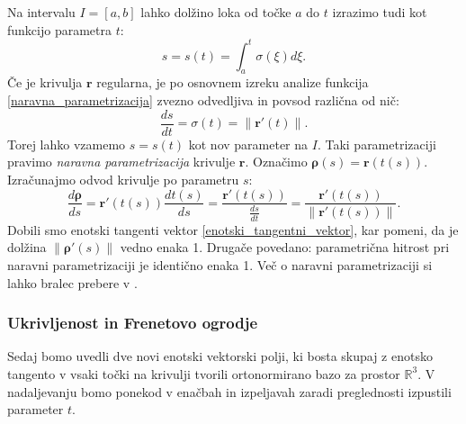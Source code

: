 \documentclass[12pt,a4paper,twoside]{article}
\theoremstyle{definition} %
\theoremstyle{plain} %
\theoremstyle{primerstyle}
\numberwithin{equation}{section}  %
\newcommand{\R}{\mathbb R}
\newcommand{\rV}{\mathbf{r}}
\newcommand{\brho}{\boldsymbol \rho}
\begin{document}
Na intervalu $I=[a,b]$ lahko dolžino loka od točke $a$ do $t$ izrazimo tudi kot funkcijo parametra $t$:
\begin{equation}
	\label{naravna_parametrizacija}
	s=s(t)=\int_a^t\sigma(\xi)d\xi.
\end{equation}
Če je krivulja $\rV$ regularna, je po osnovnem izreku analize funkcija \eqref{naravna_parametrizacija} zvezno odvedljiva in povsod različna od nič:
$$\frac{ds}{dt}=\sigma(t)=\lVert\rV'(t)\rVert.$$
Torej lahko vzamemo $s=s(t)$ kot nov parameter na $I.$ Taki parametrizaciji pravimo \emph{naravna parametrizacija} krivulje $\rV.$ Označimo $\brho(s)=\rV(t(s)).$ Izračunajmo odvod krivulje po parametru $s$:
$$\frac{d\brho}{ds}=\rV'(t(s))\frac{dt(s)}{ds}=\frac{\rV'(t(s))}{\frac{ds}{dt}}=\frac{\rV'(t(s))}{\lVert\rV'(t(s))\rVert}.$$
Dobili smo enotski tangenti vektor \eqref{enotski_tangentni_vektor}, kar pomeni, da je dolžina $\lVert\brho'(s)\rVert$ vedno enaka 1. Drugače povedano: parametrična hitrost pri naravni parametrizaciji je identično enaka 1. Več o naravni parametrizaciji si lahko bralec prebere v \cite[str. 51]{lipschutz1969schaum}.

\subsubsection{Ukrivljenost in Frenetovo ogrodje}

Sedaj bomo uvedli dve novi enotski vektorski polji, ki bosta skupaj z enotsko tangento v vsaki točki na krivulji tvorili ortonormirano bazo za prostor $\R^3.$ V nadaljevanju bomo ponekod v enačbah in izpeljavah zaradi preglednosti izpustili parameter $t.$
\end{document}
